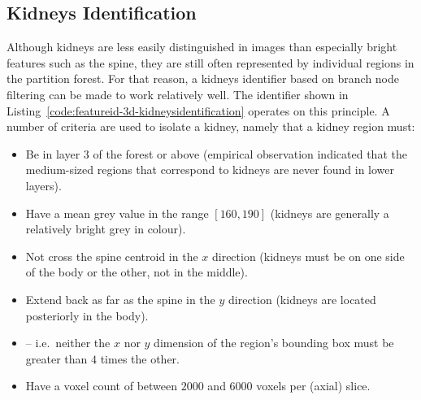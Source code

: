 \afterpage{\clearpage}
\newpage

\subsection{Kidneys Identification}



\vspace{-5mm}

\noindent Although kidneys are less easily distinguished in images than especially bright features such as the spine, they are still often represented by individual regions in the partition forest. For that reason, a kidneys identifier based on branch node filtering can be made to work relatively well. The identifier shown in Listing~\ref{code:featureid-3d-kidneysidentification} operates on this principle. A number of criteria are used to isolate a kidney, namely that a kidney region must:
%
\begin{itemize}
\item Be in layer $3$ of the forest or above (empirical observation indicated that the medium-sized regions that correspond to kidneys are never found in lower layers).
\item Have a mean grey value in the range $[160,190]$ (kidneys are generally a relatively bright grey in colour).
\item Not cross the spine centroid in the $x$ direction (kidneys must be on one side of the body or the other, not in the middle).
\item Extend back as far as the spine in the $y$ direction (kidneys are located posteriorly in the body).
\item {} -- i.e.~neither the $x$ nor $y$ dimension of the region's bounding box must be greater than $4$ times the other.
\item Have a voxel count of between $2000$ and $6000$ voxels per (axial) slice.
\end{itemize}
%


